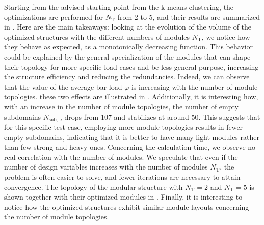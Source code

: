 Starting from the advised starting point from the k-means clustering, the optimizations are performed for $N_\text{T}$ from 2 to 5, and their results are summarized in . Here are the main takeaways: looking at the evolution of the volume of the optimized structures with the different numbers of modules $N_\text{T}$, we notice how they behave as expected, as a monotonically decreasing function. This behavior could be explained by the general specialization of the modules that can shape their topology for more specific load cases and be less general-purpose, increasing the structure efficiency and reducing the redundancies. Indeed, we can observe that the value of the average bar load $\varphi$ is increasing with the number of module topologies. these two effects are illustrated in . Additionally, it is interesting how, with an increase in the number of module topologies, the number of empty subdomains $N_\text{sub, e}$ drops from 107 and stabilizes at around 50. This suggests that for this specific test case, employing more module topologies results in fewer empty subdomains, indicating that it is better to have many light modules rather than few strong and heavy ones. Concerning the calculation time, we observe no real correlation with the number of modules. We speculate that even if the number of design variables increases with the number of modules $N_\text{T}$, the problem is often easier to solve, and fewer iterations are necessary to attain convergence. The topology of the modular structure with $N_\text{T}=2$ and $N_\text{T}=5$ is shown together with their optimized modules in . Finally, it is interesting to notice how the optimized structures exhibit similar module layouts concerning the number of module topologies.


